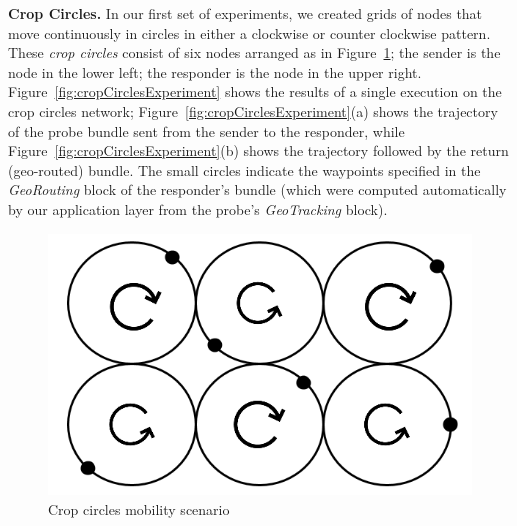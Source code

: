 {\bf Crop Circles.} In our first set of experiments, we created grids
of nodes that move continuously in circles in either a clockwise or
counter clockwise pattern. These {\em crop circles} consist of six
nodes arranged as in Figure~\ref{fig:cropcircle1}; the sender is the
node in the lower left; the responder is the node in the upper right.
Figure~\ref{fig:cropCirclesExperiment} shows the results of a single
execution on the crop circles network;
Figure~\ref{fig:cropCirclesExperiment}(a) shows the trajectory of the
probe bundle sent from the sender to the responder, while
Figure~\ref{fig:cropCirclesExperiment}(b) shows the trajectory
followed by the return (geo-routed) bundle. The small circles indicate
the waypoints specified in the {\em GeoRouting} block of the
responder's bundle (which were computed automatically by our
application layer from the probe's {\em GeoTracking} block).
\begin{figure}[!h]
\vspace{-.2cm}
\begin{center}
\includegraphics[width=.65\columnwidth]{figures/cropcircle1.png}
\end{center}
\vspace{-.75cm}
\caption{Crop circles mobility scenario}\label{fig:cropcircle1}
\vspace{-.25cm}
\end{figure}

